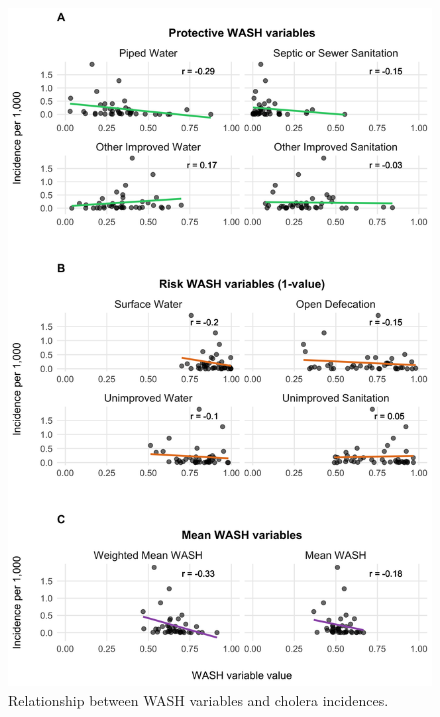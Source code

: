 \documentclass[
]{book}
\begin{document}
\begin{figure}

{\centering \includegraphics[width=1\linewidth]{figures/wash_incidence_correlation} 

}

\caption{Relationship between WASH variables and cholera incidences.}\label{fig:wash-incidence}
\end{figure}
\end{document}
